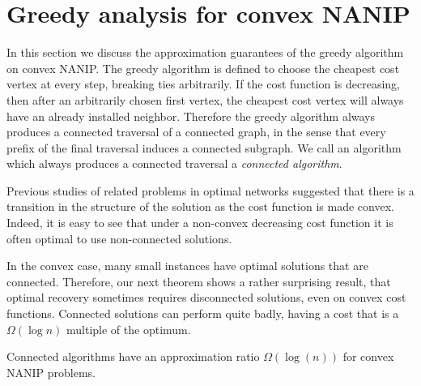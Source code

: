 \section{Greedy analysis for convex NANIP}
\label{sec:greedynanip}

In this section we discuss the approximation guarantees of the greedy algorithm
on convex NANIP. The greedy algorithm is defined to choose the cheapest cost
vertex at every step, breaking ties arbitrarily.  If the cost function is
decreasing, then after an arbitrarily chosen first vertex, the cheapest cost
vertex will always have an already installed neighbor.  Therefore the greedy
algorithm always produces a connected traversal of a connected graph, in the
sense that every prefix of the final traversal induces a connected subgraph. We
call an algorithm which always produces a connected traversal a \emph{connected
algorithm}.

Previous studies of related problems in optimal networks suggested that there
is a transition in the structure of the solution as the cost function is made
convex.  Indeed, it is easy to see that under a non-convex decreasing cost
function it is often optimal to use non-connected solutions.

In the convex case, many small instances have optimal solutions that are
connected.  Therefore, our next theorem shows a rather surprising result, that
optimal recovery sometimes requires disconnected solutions, even on convex cost
functions.  Connected solutions can perform quite badly, having a cost that is
a $\Omega(\log n)$ multiple of the optimum.

\begin{theorem}
Connected algorithms have an approximation ratio $\Omega(\log(n))$ for convex
NANIP problems.
\end{theorem}

